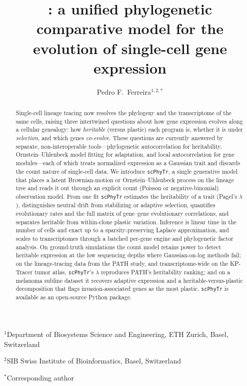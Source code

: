 \documentclass{article}
\title{\scphytr{}: a unified phylogenetic comparative model for the evolution of
single-cell gene expression}
\author{
  Pedro F.~Ferreira$^{1,2,*}$ %
}
\date{}
\date{\vspace{-5ex}}
\newenvironment{affiliations}{\begin{flushleft}\small}{\end{flushleft}}
\newcommand{\scphytr}{\texttt{scPhyTr}}
\begin{document}
\maketitle

\begin{affiliations}
 \item $^1$Department of Biosystems Science and Engineering, ETH Zurich, Basel, Switzerland
 \item $^2$SIB Swiss Institute of Bioinformatics, Basel, Switzerland
 \item $^*$Corresponding author
\end{affiliations}

\vspace{.5cm}

\begin{abstract}
Single-cell lineage tracing now resolves the phylogeny and the transcriptome of the
same cells, raising three intertwined questions about how gene expression evolves
along a cellular genealogy: how \emph{heritable} (versus plastic) each program is,
whether it is under \emph{selection}, and which genes \emph{co-evolve}. These
questions are currently answered by separate, non-interoperable tools---phylogenetic
autocorrelation for heritability, Ornstein--Uhlenbeck model fitting for adaptation,
and local autocorrelation for gene modules---each of which treats normalized
expression as a Gaussian trait and discards the count nature of single-cell data. We
introduce \scphytr{}, a single generative model that places a latent Brownian-motion
or Ornstein--Uhlenbeck process on the lineage tree and reads it out through an
explicit count (Poisson or negative-binomial) observation model. From one fit
\scphytr{} estimates the heritability of a trait (Pagel's $\lambda$), distinguishes
neutral drift from stabilizing or adaptive selection, quantifies evolutionary rates
and the full matrix of gene--gene evolutionary correlations, and separates heritable
from within-clone plastic variation. Inference is linear time in the number of cells
and exact up to a sparsity-preserving Laplace approximation, and scales to
transcriptomes through a batched per-gene engine and phylogenetic factor analysis. On
ground-truth simulations the count model retains power to detect heritable expression
at the low sequencing depths where Gaussian-on-log methods fail; on the lineage-tracing
data from the PATH study, and transcriptome-wide on the KP-Tracer tumor atlas, \scphytr{}'s
$\lambda$ reproduces PATH's heritability ranking; and on a melanoma subline dataset it recovers adaptive expression and a heritable-versus-plastic
decomposition that flags invasion-associated genes as the most plastic. \scphytr{} is
available as an open-source Python package.
\end{abstract}
\end{document}
